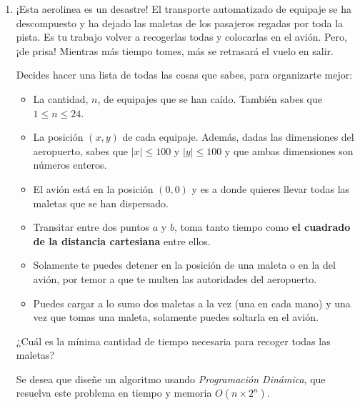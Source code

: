 \documentclass[letterpaper, 12pt]{article}
\begin{document}
\begin{enumerate}

\item ¡Esta aerolinea es un desastre! El transporte automatizado de equipaje se ha descompuesto y ha dejado las maletas de los pasajeros regadas por toda la pista. Es tu trabajo volver a recogerlas todas y colocarlas en el avión. Pero, ¡de prisa! Mientras más tiempo tomes, más se retrasará el vuelo en salir.

Decides hacer una lista de todas las cosas que sabes, para organizarte mejor:

\begin{itemize}
    \item La cantidad, $n$, de equipajes que se han caído. También sabes que $1 \leq n \leq 24$.

    \item La posición $(x, y)$ de cada equipaje. Además, dadas las dimensiones del aeropuerto, sabes que $|x| \leq 100$ y $|y| \leq 100$ y que ambas dimensiones son números enteros.
    \item El avión está en la posición $(0, 0)$ y es a donde quieres llevar todas las maletas que se han dispersado.
    \item Transitar entre dos puntos $a$ y $b$, toma tanto tiempo como \textbf{el cuadrado de la distancia cartesiana} entre ellos.
    \item Solamente te puedes detener en la posición de una maleta o en la del avión, por temor a que te multen las autoridades del aeropuerto.
    \item Puedes cargar a lo sumo dos maletas a la vez (una en cada mano) y una vez que tomas una maleta, solamente puedes soltarla en el avión.
\end{itemize}

¿Cuál es la mínima cantidad de tiempo necesaria para recoger todas las maletas?

Se desea que diseñe un algoritmo usando \emph{Programación Dinámica}, que resuelva este problema en tiempo y memoria $O(n \times 2^n)$.

\end{enumerate} \vspace{4mm}
\end{document}
